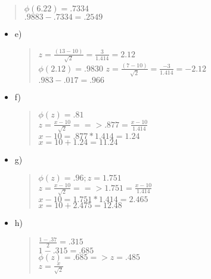 \documentclass{article}
\begin{document}
\begin{enumerate}
\begin{itemize}
\begin{quote}
                $\phi(6.22) = .7334$ \\
                $.9883-.7334=.2549$
            \end{quote}
        \end{itemize}
        \begin{itemize}
            \item e)
            \begin{quote}
                $z = \frac{(13-10)}{\sqrt{2}} = \frac{3}{1.414} = 2.12$ \\
                $\phi(2.12) = .9830$
                $z = \frac{(7-10)}{\sqrt{2}} = \frac{-3}{1.414} = -2.12$ \\
                $.983 - .017 = .966$
            \end{quote}
        \end{itemize}
        \begin{itemize}
            \item f)
            \begin{quote}
                $\phi(z) = .81$\\
                $z = \frac{x-10}{\sqrt{2}} ==> .877 = \frac{x-10}{1.414}$ \\
                $x-10 = .877*1.414 = 1.24$ \\
                $x = 10+1.24 = 11.24$
            \end{quote}
        \end{itemize}
        \begin{itemize}
            \item g)
            \begin{quote}
                $\phi(z) = .96; z = 1.751$ \\
                $z = \frac{x-10}{\sqrt{2}} ==> 1.751 = \frac{x-10}{1.414}$ \\
                $x-10 = 1.751*1.414 = 2.465$ \\
                $x = 10 + 2.475 = 12.48$
            \end{quote}
        \end{itemize}
        \begin{itemize}
            \item h)
            \begin{quote}
                $\frac{1-.37}{2} = .315$ \\
                $1-.315 = .685$ \\
                $\phi(z) = .685 => z = .485$ \\
                $z = \frac{x}{\sqrt{2}}$ \\

\end{quote}
\end{itemize}
\end{enumerate}
\end{document}
